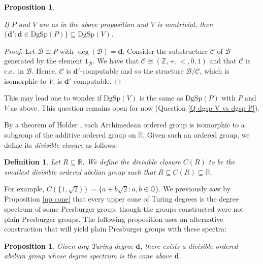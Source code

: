 \documentclass{amsart}%
\numberwithin{theorem}{section}
\newtheorem{definition}[theorem]{Definition}
\newtheorem{proposition}[theorem]{Proposition}
\newcommand{\Q}{\mathbb{Q}}
\newcommand{\R}{\mathbb{R}}
\newcommand{\Z}{\mathbb{Z}}
\newcommand{\B}{\mathcal{B}}
\newcommand{\CC}{\mathcal{C}}
\newcommand{\0}{\emptyset}
\newcommand{\ddd}{\boldsymbol{d}}
\newcommand{\dgsp}{\text{DgSp}}
\begin{document}
\begin{proposition}
\label{prop d' in dgV}

    If $P$ and $V$ are as in the above proposition and $V$ is nontrivial, then $\{\ddd':\ddd\in \dgsp(P)\}\subseteq \dgsp(V)$.  
\end{proposition} 

\begin{proof}
    Let $\B\cong P$ with $\deg(\B)=\ddd$. Consider the substructure $\CC$ of $\B$ generated by the element $1_\B$. We have that $\CC\cong (\Z,+,<,0,1)$ and that $\CC$ is c.e.\ in $\B$. Hence, $\CC$ is $\ddd'$-computable and so the structure $\B/\CC$, which is isomorphic to $V$, is $\ddd'$-computable.
\end{proof}

\noindent This may lead one to wonder if $\dgsp(V)$ is the same as $\dgsp(P)$ with $P$ and $V$ as above. This question remains open for now (Question \ref{Q dgsp V vs dgsp P}).  

By a theorem of Holder \cite{holder}, each Archimedean ordered group is isomorphic to a subgroup of the additive ordered group on $\R$. Given such an ordered group, we  define its \emph{divisible closure} as follows:

\begin{definition}
\label{closure}
Let $R\subseteq \R$. We define the divisible closure $C(R)$ to be the smallest divisible ordered abelian group such that $R\subseteq C(R) \subseteq \R$. 
\end{definition}

\noindent For example, $C(\{1,\sqrt2 \})=\{a+b\sqrt{2}:a,b\in \Q\}$.
We previously saw by Proposition \ref{up cone} that every upper cone of Turing degrees is the degree spectrum of some Presburger group, though the groups constructed were not plain Presburger groups.  The following proposition uses an alternative construction that will yield plain Presburger groups with these spectra:

\begin{proposition}
\label{upper cone}
Given any Turing degree $\ddd$, there exists a divisible ordered abelian group whose degree spectrum is the cone above $\ddd$. 
\end{proposition}
\end{document}
